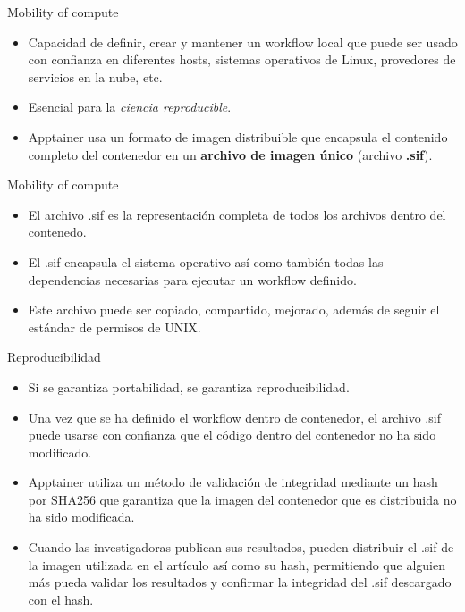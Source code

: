\documentclass[11pt]{beamer}
\begin{document}
\begin{frame}{Mobility of compute}
  \begin{itemize}
  	\item Capacidad de definir, crear y mantener un workflow local que puede ser usado con confianza en diferentes hosts, sistemas operativos de Linux, provedores de servicios en la nube, etc.
  	\item Esencial para la \textit{ciencia reproducible}.
  	\item Apptainer usa un formato de imagen distribuible que encapsula el contenido completo del contenedor en un \textbf{archivo de imagen único} (archivo \textbf{.sif}).

  \end{itemize}
\end{frame}

\begin{frame}{Mobility of compute}
  \begin{itemize}
 	\item El archivo .sif es la representación completa de todos los archivos dentro del contenedo.
 	\item El .sif encapsula el sistema operativo así como también todas las dependencias necesarias para ejecutar un workflow definido.
  	\item Este archivo puede ser copiado, compartido, mejorado, además de seguir el estándar de permisos de UNIX.
  \end{itemize}
\end{frame}


\begin{frame}{Reproducibilidad}
  \begin{itemize}
  	\item Si se garantiza portabilidad, se garantiza reproducibilidad.
 
  	\item Una vez que se ha definido el workflow dentro de contenedor, el archivo .sif puede usarse con confianza que el código dentro del contenedor no ha sido modificado.
  	\item Apptainer utiliza un método de validación de integridad mediante un hash por SHA256 que garantiza que la imagen del contenedor que es distribuida no ha sido modificada. 
  	\item Cuando las investigadoras publican sus resultados, pueden distribuir el .sif de la imagen utilizada en el artículo así como su hash, permitiendo que alguien más pueda validar los resultados y confirmar la integridad del .sif descargado con el hash. 
  \end{itemize}
\end{frame}
\end{document}
